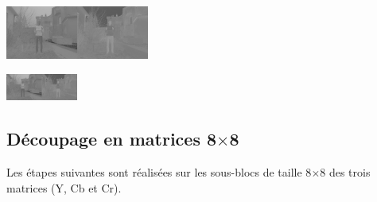 \documentclass{article}
\begin{document}
\begin{center}
    \vspace{.6cm}
    
    \noindent
    \begin{minipage}[t]{0.25\textwidth}
        \centering
        \includegraphics[width=4.7cm,height=1.76cm]{cbcr.png}
    \end{minipage}
    \hspace{.24cm}
    \begin{minipage}[t]{0.2\textwidth}
        \centering
        \vspace{-1.3cm}
    \end{minipage}
    \begin{minipage}[t]{0.25\textwidth}
        \centering
        \vspace{-1.2cm}
        \includegraphics[width=2.35cm,height=0.88cm]{cbcr.png}
    \end{minipage}

\end{center}


\subsection{Découpage en matrices 8$\times$8}
Les étapes suivantes sont réalisées sur les sous-blocs de taille 8$\times$8 des trois matrices (Y, Cb et Cr).
\end{document}
